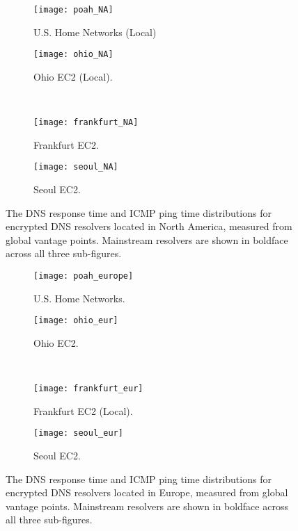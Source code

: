 \begin{figure*}[t!]
\centering
%
\begin{subfigure}[b]{0.4\textwidth}
\texttt{[image: poah\_NA]}
    \caption{U.S. Home Networks (Local)}
\end{subfigure}
%
\begin{subfigure}[b]{0.4\textwidth}
\texttt{[image: ohio\_NA]}
    \caption{Ohio EC2 (Local).}
\end{subfigure}
%
\hfill \\
\begin{subfigure}[b]{0.4\textwidth}
\texttt{[image: frankfurt\_NA]}
    \caption{Frankfurt EC2.}
\end{subfigure}
%
\begin{subfigure}[b]{0.4\textwidth}
\texttt{[image: seoul\_NA]}
\caption{Seoul EC2.}
\end{subfigure}
\caption{The DNS response time and ICMP ping time distributions for
    encrypted DNS resolvers located in North America, measured from global vantage points.
    Mainstream resolvers are shown in boldface across all three
    sub-figures.}
\label{fig:dns-NA}
\end{figure*}



\begin{figure*}[t!]
\centering
%
\begin{subfigure}[b]{0.4\textwidth}
\texttt{[image: poah\_europe]}
\caption{U.S. Home Networks.}
\end{subfigure}
%
\begin{subfigure}[b]{0.4\textwidth}
\texttt{[image: ohio\_eur]}
\caption{Ohio EC2.}
\end{subfigure}
%
\hfill \\
\begin{subfigure}[b]{0.4\textwidth}
\texttt{[image: frankfurt\_eur]}
    \caption{Frankfurt EC2 (Local).}
\end{subfigure}
%
\begin{subfigure}[b]{0.4\textwidth}
\texttt{[image: seoul\_eur]}
\caption{Seoul EC2.}
\end{subfigure}
\caption{The DNS response time and ICMP ping time distributions for
    encrypted DNS resolvers located in Europe, measured from global vantage points.
    Mainstream resolvers are shown in boldface across all three
    sub-figures.}
\label{fig:dns-europe}
\end{figure*}

